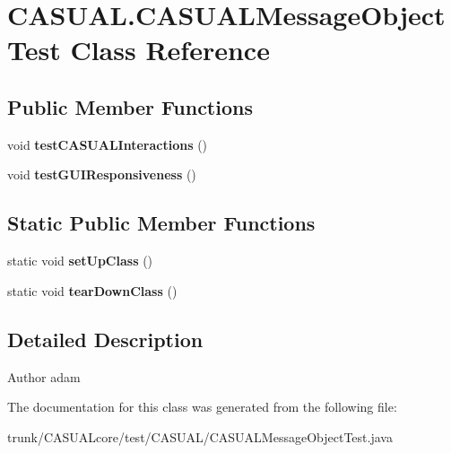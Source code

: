 \hypertarget{class_c_a_s_u_a_l_1_1_c_a_s_u_a_l_message_object_test}{\section{C\-A\-S\-U\-A\-L.\-C\-A\-S\-U\-A\-L\-Message\-Object\-Test Class Reference}
\label{class_c_a_s_u_a_l_1_1_c_a_s_u_a_l_message_object_test}
}
\subsection*{Public Member Functions}
\begin{DoxyCompactItemize}
\item 
\hypertarget{class_c_a_s_u_a_l_1_1_c_a_s_u_a_l_message_object_test_a4389dc4ab1b2c50e00d536b0fed8c66f}{void {\bfseries test\-C\-A\-S\-U\-A\-L\-Interactions} ()}\label{class_c_a_s_u_a_l_1_1_c_a_s_u_a_l_message_object_test_a4389dc4ab1b2c50e00d536b0fed8c66f}

\item 
\hypertarget{class_c_a_s_u_a_l_1_1_c_a_s_u_a_l_message_object_test_aab1eaa948682d49a1e01826edc48cb71}{void {\bfseries test\-G\-U\-I\-Responsiveness} ()}\label{class_c_a_s_u_a_l_1_1_c_a_s_u_a_l_message_object_test_aab1eaa948682d49a1e01826edc48cb71}

\end{DoxyCompactItemize}
\subsection*{Static Public Member Functions}
\begin{DoxyCompactItemize}
\item 
\hypertarget{class_c_a_s_u_a_l_1_1_c_a_s_u_a_l_message_object_test_aab2d5df2f753971793093163c12c2413}{static void {\bfseries set\-Up\-Class} ()}\label{class_c_a_s_u_a_l_1_1_c_a_s_u_a_l_message_object_test_aab2d5df2f753971793093163c12c2413}

\item 
\hypertarget{class_c_a_s_u_a_l_1_1_c_a_s_u_a_l_message_object_test_a98b14d25f9c98c87fb8c382b89103bab}{static void {\bfseries tear\-Down\-Class} ()}\label{class_c_a_s_u_a_l_1_1_c_a_s_u_a_l_message_object_test_a98b14d25f9c98c87fb8c382b89103bab}

\end{DoxyCompactItemize}


\subsection{Detailed Description}
\begin{DoxyAuthor}{Author}
adam 
\end{DoxyAuthor}


The documentation for this class was generated from the following file\-:\begin{DoxyCompactItemize}
\item 
trunk/\-C\-A\-S\-U\-A\-Lcore/test/\-C\-A\-S\-U\-A\-L/C\-A\-S\-U\-A\-L\-Message\-Object\-Test.\-java\end{DoxyCompactItemize}
